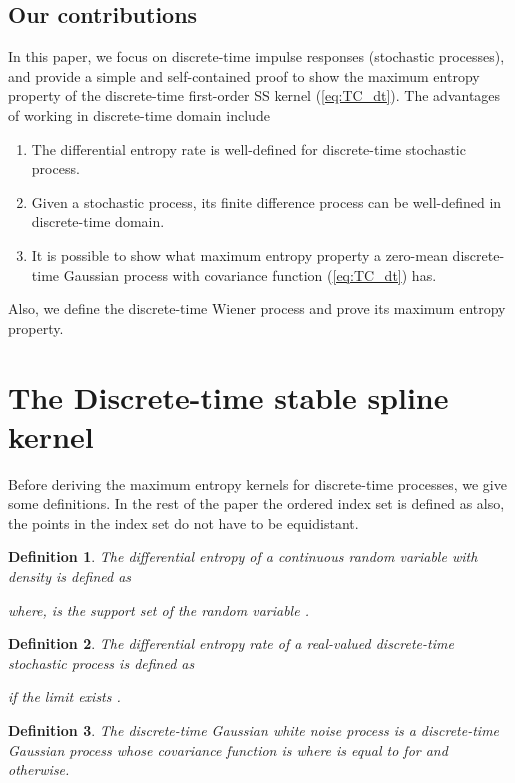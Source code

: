 \documentclass{article}
\newtheorem{mydef}{Definition}
\begin{document}
\subsection{Our contributions}
In this paper, we focus on discrete-time impulse responses
(stochastic processes), and provide a simple and self-contained
proof to show  the maximum entropy property of the discrete-time
first-order SS kernel (\ref{eq:TC_dt}). The advantages of working in
discrete-time domain include
\begin{enumerate}
\item The differential entropy rate is well-defined for discrete-time stochastic process.\vspace{-3mm}
\item Given a stochastic process, its finite difference process can be well-defined in discrete-time domain.\vspace{-3mm}
\item It is possible to show what maximum entropy property a zero-mean discrete-time Gaussian process with covariance function (\ref{eq:TC_dt}) has.\vspace{-2mm}
\end{enumerate}
Also, we define the discrete-time Wiener process and prove its
maximum entropy property.

\section{The Discrete-time stable spline kernel}
\label{sec:DTmaxEnt} Before deriving the maximum entropy kernels for
discrete-time  processes, we give some definitions. In the
rest of the paper the ordered index set  is defined as
 also,
the points  in the index set  do not have to be
equidistant.
\begin{mydef}
The differential entropy  of a continuous random variable  with density  is defined as

where,  is the support set of the random variable \cite{Cover}. \hfill 
\end{mydef}
\begin{mydef}
The differential entropy rate of a real-valued discrete-time
stochastic process 
is defined as

if the limit exists \cite{Cover}.    \hfill 
\end{mydef}


\begin{mydef}
The discrete-time Gaussian white noise process is a
discrete-time Gaussian process whose covariance function is
 \cite{Vantrees}  where  is
equal to  for  and  otherwise. \hfill 


\end{mydef}
\end{document}
